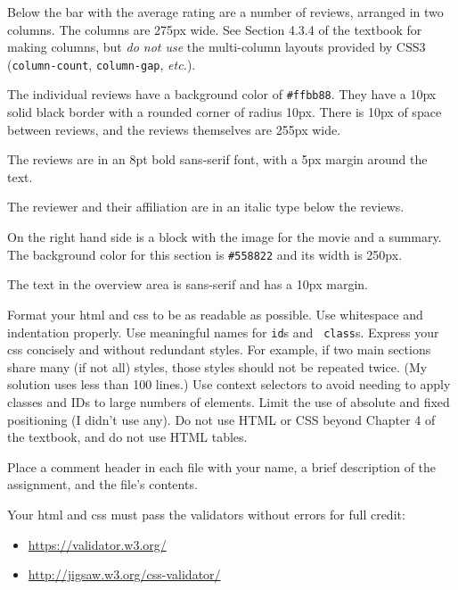 \documentclass{article}
\newcommand{\myitem}[1]{\noindent{\bf #1}}
\begin{document}
Below the bar with the average rating are a number of reviews,
arranged in two columns.
The columns are 275px wide. See Section 4.3.4 of the textbook for making
columns, but {\em do not use} the multi-column layouts provided by
CSS3 ({\tt column-count}, {\tt column-gap}, {\em etc.}).  

The individual reviews have a background color of \verb|#ffbb88|.
They have a 10px solid black border with a rounded corner of radius
10px. There is 10px of space between reviews, and the reviews
themselves are 255px wide.

The reviews are in an 8pt bold sans-serif font, with a 5px margin
around the text.

The reviewer and their affiliation are in an italic type below the
reviews. 


On the right hand side is a block with the image for the movie and a
summary.  The background color for this section is \verb|#558822| and
its width is 250px.

The text in the overview area is sans-serif and has a 10px margin.

\myitem{Style:}

Format your html and css to be as readable as possible. Use whitespace
and indentation properly.  Use meaningful names for {\tt id}s and {\tt
  class}s.  Express your css concisely and without redundant styles.
For example, if two main sections share many (if not all) styles,
those styles should not be repeated twice. (My solution uses less than
100 lines.)  Use context selectors to avoid needing to apply classes
and IDs to large numbers of elements.  Limit the use of absolute and
fixed positioning (I didn't use any).  Do not use HTML or CSS beyond
Chapter 4 of the textbook, and do not use HTML tables.

Place a comment header in each file with your name, a brief
description of the assignment, and the file's contents.


\myitem{Validate your files:}

Your html and css must pass the validators without errors for full
credit:\begin{itemize}\item
\url{https://validator.w3.org/}\item
\url{http://jigsaw.w3.org/css-validator/}\end{itemize}
\end{document}
